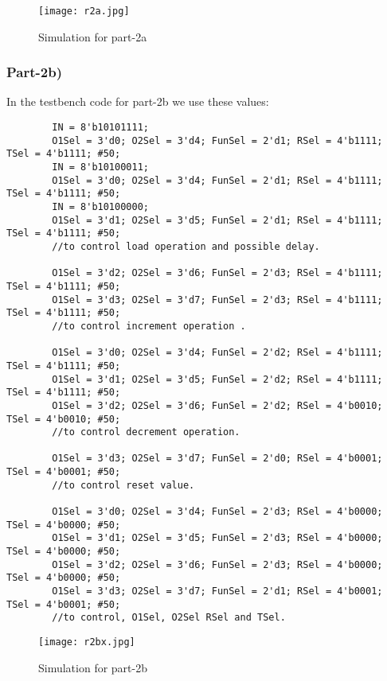 \documentclass[12pt]{article}
\begin{document}
\begin{figure}[H]
    \centering
    \texttt{[image: r2a.jpg]}
    \caption{Simulation for part-2a}
    \label{fig:result2a}
\end{figure}

\clearpage

\subsubsection{Part-2b)}

In the testbench code for part-2b we use these values:

\begin{lstlisting}
        IN = 8'b10101111;
        O1Sel = 3'd0; O2Sel = 3'd4; FunSel = 2'd1; RSel = 4'b1111; TSel = 4'b1111; #50;
        IN = 8'b10100011;
        O1Sel = 3'd0; O2Sel = 3'd4; FunSel = 2'd1; RSel = 4'b1111; TSel = 4'b1111; #50;
        IN = 8'b10100000;
        O1Sel = 3'd1; O2Sel = 3'd5; FunSel = 2'd1; RSel = 4'b1111; TSel = 4'b1111; #50;
        //to control load operation and possible delay.
        
        O1Sel = 3'd2; O2Sel = 3'd6; FunSel = 2'd3; RSel = 4'b1111; TSel = 4'b1111; #50;
        O1Sel = 3'd3; O2Sel = 3'd7; FunSel = 2'd3; RSel = 4'b1111; TSel = 4'b1111; #50;
        //to control increment operation .
        
        O1Sel = 3'd0; O2Sel = 3'd4; FunSel = 2'd2; RSel = 4'b1111; TSel = 4'b1111; #50;
        O1Sel = 3'd1; O2Sel = 3'd5; FunSel = 2'd2; RSel = 4'b1111; TSel = 4'b1111; #50;
        O1Sel = 3'd2; O2Sel = 3'd6; FunSel = 2'd2; RSel = 4'b0010; TSel = 4'b0010; #50;
        //to control decrement operation.
        
        O1Sel = 3'd3; O2Sel = 3'd7; FunSel = 2'd0; RSel = 4'b0001; TSel = 4'b0001; #50;
        //to control reset value.
        
        O1Sel = 3'd0; O2Sel = 3'd4; FunSel = 2'd3; RSel = 4'b0000; TSel = 4'b0000; #50;
        O1Sel = 3'd1; O2Sel = 3'd5; FunSel = 2'd3; RSel = 4'b0000; TSel = 4'b0000; #50;
        O1Sel = 3'd2; O2Sel = 3'd6; FunSel = 2'd3; RSel = 4'b0000; TSel = 4'b0000; #50;
        O1Sel = 3'd3; O2Sel = 3'd7; FunSel = 2'd1; RSel = 4'b0001; TSel = 4'b0001; #50;
        //to control, O1Sel, O2Sel RSel and TSel.
\end{lstlisting}

\begin{figure}[H]
    \centering
    \texttt{[image: r2bx.jpg]}
    \caption{Simulation for part-2b}
    \label{fig:result2b}
\end{figure}
\end{document}
